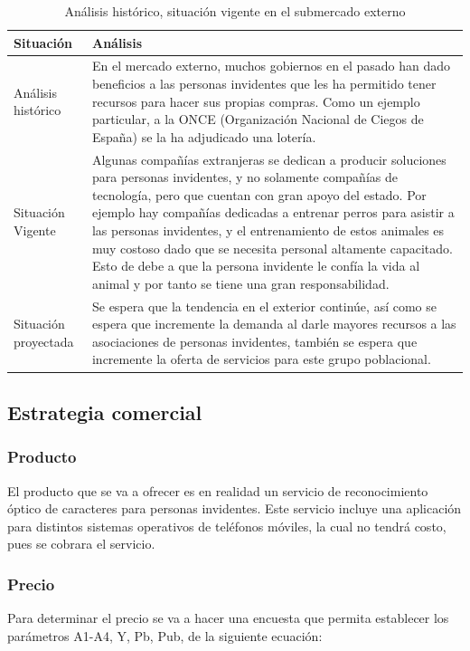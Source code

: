 \documentclass[a4paper, 12pt, oneside]{article}
\begin{document}
	\begin{table}
		\caption{Análisis histórico, situación vigente en el submercado externo}
		\begin{tabular}{ | p{4cm} | p{10cm} | }
		\hline
		Situación & Análisis \\
		\hline					
		Análisis histórico & 
		En el mercado externo, muchos gobiernos en el pasado han dado beneficios a las personas invidentes que les ha permitido tener recursos para hacer sus propias compras. Como un ejemplo particular, a la ONCE (Organización Nacional de Ciegos de España) se la ha adjudicado una lotería. \\
		\hline
		Situación Vigente &
		Algunas compañías extranjeras se dedican a producir soluciones para personas invidentes, y no solamente compañías de tecnología, pero que cuentan con gran apoyo del estado. Por ejemplo hay compañías dedicadas a entrenar perros para asistir a las personas invidentes, y el entrenamiento de estos animales es muy costoso dado que se necesita personal altamente capacitado. Esto de debe a que la persona invidente le confía la vida al animal y por tanto se tiene una gran responsabilidad. \\
		\hline
		Situación proyectada &
		Se espera que la tendencia en el exterior continúe, así como se espera que incremente la demanda al darle mayores recursos a las asociaciones de personas invidentes, también se espera que incremente la oferta de servicios para este grupo poblacional. \\
		\hline
		\end{tabular}
		\label{extHistorico}
	\end{table}
		
	\subsection{Estrategia comercial}
	 
	\subsubsection{Producto}
	El producto que se va a ofrecer es en realidad un servicio de reconocimiento óptico de caracteres para personas invidentes. Este servicio incluye una aplicación para distintos
	sistemas operativos de teléfonos móviles, la cual no tendrá costo, pues se cobrara el servicio.

	\subsubsection{Precio}
	Para determinar el precio se va a hacer una encuesta que permita establecer los parámetros A1-A4, Y, Pb, Pub, de la siguiente ecuación:
\end{document}
